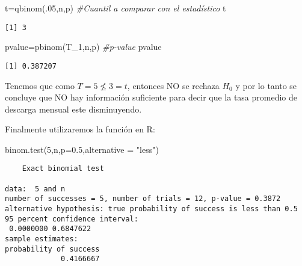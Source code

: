 \documentclass[
  a4paper,
  oneside,
  openany]{book}
\newenvironment{Shaded}{\begin{snugshade}}{\end{snugshade}}
\newcommand{\AttributeTok}[1]{\textcolor[rgb]{0.77,0.63,0.00}{#1}}
\newcommand{\CommentTok}[1]{\textcolor[rgb]{0.56,0.35,0.01}{\textit{#1}}}
\newcommand{\DecValTok}[1]{\textcolor[rgb]{0.00,0.00,0.81}{#1}}
\newcommand{\FloatTok}[1]{\textcolor[rgb]{0.00,0.00,0.81}{#1}}
\newcommand{\FunctionTok}[1]{\textcolor[rgb]{0.00,0.00,0.00}{#1}}
\newcommand{\NormalTok}[1]{#1}
\newcommand{\OtherTok}[1]{\textcolor[rgb]{0.56,0.35,0.01}{#1}}
\newcommand{\StringTok}[1]{\textcolor[rgb]{0.31,0.60,0.02}{#1}}
\begin{document}
\begin{Shaded}
\begin{Highlighting}[]
\NormalTok{t}\OtherTok{=}\FunctionTok{qbinom}\NormalTok{(.}\DecValTok{05}\NormalTok{,n,p)       }\CommentTok{\#Cuantil a comparar con el estadístico}
\NormalTok{t}
\end{Highlighting}
\end{Shaded}

\begin{verbatim}
[1] 3
\end{verbatim}

\begin{Shaded}
\begin{Highlighting}[]
\NormalTok{pvalue}\OtherTok{=}\FunctionTok{pbinom}\NormalTok{(T\_1,n,p)  }\CommentTok{\#p{-}value}
\NormalTok{pvalue}
\end{Highlighting}
\end{Shaded}

\begin{verbatim}
[1] 0.387207
\end{verbatim}

Tenemos que como \(T=5\nleq 3 =t\), entonces NO se rechaza \(H_0\) y por lo tanto se concluye que NO hay información suficiente para decir que la tasa promedio de descarga mensual este disminuyendo.

Finalmente utilizaremos la función en R:

\begin{Shaded}
\begin{Highlighting}[]
\FunctionTok{binom.test}\NormalTok{(}\DecValTok{5}\NormalTok{,n,}\AttributeTok{p=}\FloatTok{0.5}\NormalTok{,}\AttributeTok{alternative =} \StringTok{"less"}\NormalTok{)}
\end{Highlighting}
\end{Shaded}

\begin{verbatim}
    Exact binomial test

data:  5 and n
number of successes = 5, number of trials = 12, p-value = 0.3872
alternative hypothesis: true probability of success is less than 0.5
95 percent confidence interval:
 0.0000000 0.6847622
sample estimates:
probability of success 
             0.4166667 
\end{verbatim}
\end{document}
